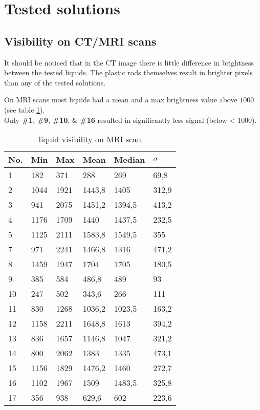 \section{Tested solutions}

\subsection{Visibility on CT/MRI scans}

It should be noticed that in the CT image there is little difference in brightness between the tested liquids.
The plastic rods themselves result in brighter pixels than any of the tested solutions.

On MRI scans most liquids had a mean and a max brightness value above $1000$ (see table \ref{tab:visibility}).\\
Only \textbf{\#1}, \textbf{\#9}, \textbf{\#10}, \& \textbf{\#16} resulted in significantly less signal (below < $1000$).


\begin{table}[!htb]
\centering
\begin{tabular}{@{}l|lllll@{}}
\toprule
No. & Min  & Max  & Mean   & Median & $\sigma$ \\ \midrule
1   & 182  & 371  & 288    & 269    & 69,8     \\
2   & 1044 & 1921 & 1443,8 & 1405   & 312,9    \\
3   & 941  & 2075 & 1451,2 & 1394,5 & 413,2    \\
4   & 1176 & 1709 & 1440   & 1437,5 & 232,5    \\
5   & 1125 & 2111 & 1583,8 & 1549,5 & 355      \\
7   & 971  & 2241 & 1466,8 & 1316   & 471,2    \\
8   & 1459 & 1947 & 1704   & 1705   & 180,5    \\
9   & 385  & 584  & 486,8  & 489    & 93       \\
10  & 247  & 502  & 343,6  & 266    & 111      \\
11  & 830  & 1268 & 1036,2 & 1023,5 & 163,2    \\
12  & 1158 & 2211 & 1648,8 & 1613   & 394,2    \\
13  & 836  & 1657 & 1146,8 & 1047   & 321,2    \\
14  & 800  & 2062 & 1383   & 1335   & 473,1    \\
15  & 1156 & 1829 & 1476,2 & 1460   & 272,7    \\
16  & 1102 & 1967 & 1509   & 1483,5 & 325,8    \\
17  & 356  & 938  & 629,6  & 602    & 223,6    \\ \bottomrule
\end{tabular}
\caption{liquid visibility on MRI scan}
\label{tab:visibility}
\end{table}

